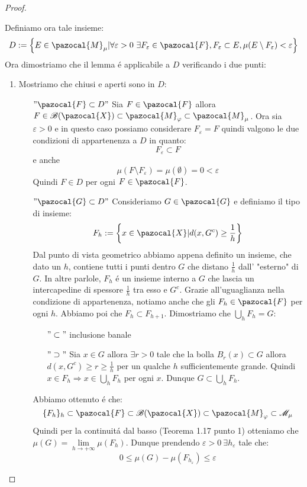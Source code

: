 \documentclass[11pt,a4paper]{report}
\theoremstyle{plain}
\theoremstyle{definition}
\newcommand{\M}{\pazocal{M}_\varphi}
\newcommand{\X}{\pazocal{X}}
\newcommand{\F}{\pazocal{F}}
\newcommand{\G}{\pazocal{G}}
\newcommand{\B}{\mathcal{B}}
\begin{document}
\begin{proof}
\begin{enumerate}
		Definiamo ora tale insieme:
		\[
			D := \left\{E\in \pazocal{M}_\mu | \forall \varepsilon >0\ \exists F_\varepsilon \in \F, F_\varepsilon \subset E, \mu(E \setminus F_\varepsilon) < \varepsilon \right\}		
		\]
		Ora dimostriamo che il lemma \'e applicabile a $D$ verificando i due punti:
		\begin{enumerate}
			\item Mostriamo che chiusi e aperti sono in $D$: \begin{itemize}
				\item[$"\F \subset D"$] Sia $F \in \F$ allora $F \in \B(\X) \subset \M \subset \pazocal{M}_\mu$. Ora sia $\varepsilon >0$ e in questo caso possiamo considerare $F_\varepsilon = F$ quindi valgono le due condizioni di appartenenza a $D$ in quanto:
				\[
					F_\varepsilon \subset F
				\]
				e anche 
				\[
					\mu(F \setminus F_\varepsilon) = \mu(\emptyset) = 0 < \varepsilon				
				\]
				Quindi $F \in D$ per ogni $F \in \F$.
				\item[$"\G \subset D"$] Consideriamo $G \in \G$ e definiamo il tipo di insieme:
				\[
					F_h := \left\{x \in \X | d(x,G^c) \ge \frac{1}{h}\right\}				
				\]
				Dal punto di vista geometrico abbiamo appena definito un insieme, che dato un $h$, contiene tutti i punti dentro $G$ che distano $\frac{1}{h}$ dall' "esterno" di $G$. In altre parlole, $F_h$ \'e un insieme interno a $G$ che lascia un intercapedine di spessore $\frac{1}{h}$ tra esso e $G^c$. Grazie all'uguaglianza nella condizione di appartenenza, notiamo anche che gli $F_h \in \F$ per ogni $h$. Abbiamo poi che $F_h \subset F_{h+1}$. Dimostriamo che $\bigcup\limits_hF_h = G$:
				\begin{itemize}
					\item[$"\subset"$] inclusione banale
					\item[$"\supset"$] Sia $x\in G$ allora $\exists r>0$ tale che la bolla $B_r(x) \subset G$ allora $d(x,G^c)\ge r \ge \frac{1}{h}$ per un qualche $h$ sufficientemente grande. Quindi $x \in F_h \Rightarrow x \in \bigcup\limits_hF_h$ per ogni $x$. Dunque $G \subset \bigcup\limits_hF_h$.
				\end{itemize}
				Abbiamo ottenuto \'e che:
				\[
					\{F_h\}_h \subset \F \subset \B(\X) \subset \M \subset \mathcal{M}_\mu				
				\]
				Quindi per la continuit\'a dal basso (Teorema 1.17 punto 1) otteniamo che $\mu(G) = \lim\limits_{h\rightarrow +\infty}\mu(F_h)$. Dunque prendendo $\varepsilon > 0\ \exists h_\varepsilon$ tale che:
				\begin{equation} 
				0 \le \mu(G) - \mu(F_{h_\varepsilon}) \le \varepsilon

\end{equation}
\end{itemize}
\end{enumerate}
\end{enumerate}
\end{proof}
\end{document}

